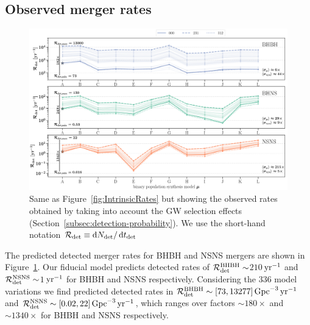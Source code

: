 \documentclass[twocolumn]{aastex63}
\newcommand\rate{\mathcal{R}}
\newcommand\rateObsBHBH{$210$\xspace}
\newcommand\rateObsNSNS{$1$\xspace}
\newcommand{\yearmin}{\ensuremath{\,\rm{yr}^{-1}}\xspace}
\newcommand{\GpcminThree}{\ensuremath{\,\rm{Gpc}^{-3}}\xspace}
\newcommand{\tdet}{\ensuremath{{t}_{\rm{det}}}\xspace}
\newcommand{\Ndet}{\ensuremath{{N}_{\rm{det}}}\xspace}
\newcommand*\diff{\mathop{}\!\mathrm{d}}
\newcommand{\Nmodels}{\ensuremath{336}\xspace}
\newcommand{\RateObservedAzeroBHBHmax}{\ensuremath{13277}\xspace}
\newcommand{\RateObservedAzeroBHBHmin}{\ensuremath{73}\xspace}
\newcommand{\RateObservedAzeroNSNSmax}{\ensuremath{22}\xspace}
\newcommand{\RateObservedAzeroNSNSmin}{\ensuremath{0.02}\xspace}
\begin{document}
\subsection{Observed merger rates}

%
\begin{figure}
    \centering
\includegraphics[width=1.0\textwidth]{../PlottingScripts/8_PredictedRates_BPS_and_MSSFR_variations/Rates_observed_AllDCO.png} 
    \caption{Same as Figure~\ref{fig:IntrinsicRates} but showing the observed rates obtained by taking into account the \ac{GW} selection effects (Section~\ref{subsec:detection-probability}). We use the short-hand notation $\rate_{\rm{det}} \equiv \diff \Ndet / \diff \tdet$}%
    \label{fig:ObservedRatesBBHBNSBHNS}
\end{figure}
%


The predicted detected merger rates for \ac{BHBH} and \ac{NSNS} mergers  are shown in Figure~\ref{fig:ObservedRatesBBHBNSBHNS}. 
Our fiducial model predicts detected rates of $\rate_{\rm{det}}^{\rm{BHBH}} \sim$\rateObsBHBH    \yearmin and $\rate_{\rm{det}}^{\rm{NSNS}} \sim$\rateObsNSNS   \yearmin for \ac{BHBH} and \ac{NSNS} respectively.  Considering the \Nmodels model variations we find predicted detected rates in $\rate_{\rm{det}}^{\rm{BHBH}}  \sim [\RateObservedAzeroBHBHmin, \RateObservedAzeroBHBHmax]\GpcminThree \yearmin$  and $\rate_{\rm{det}}^{\rm{NSNS}}  \sim [\RateObservedAzeroNSNSmin, \RateObservedAzeroNSNSmax]\GpcminThree \yearmin$, which ranges over  factors $\sim 180\times$ and $\sim 1340\times$ for \ac{BHBH} and \ac{NSNS} respectively. 
\end{document}
